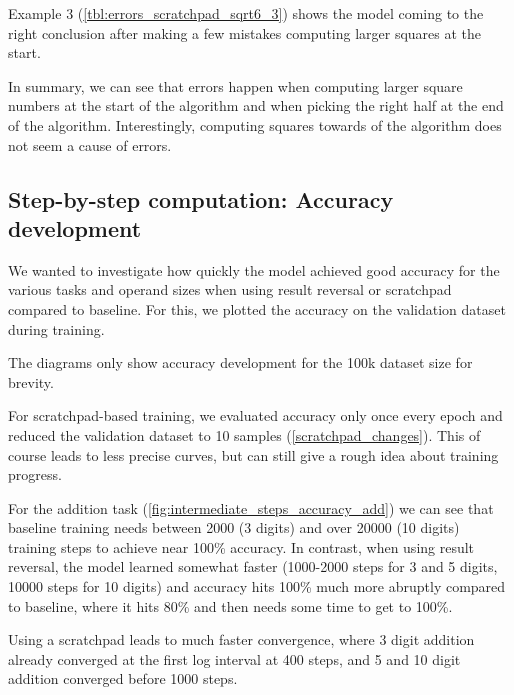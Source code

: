 Example 3 (\cref{tbl:errors_scratchpad_sqrt6_3}) shows the model coming to the right conclusion after making a few mistakes computing larger squares at the start.

In summary, we can see that errors happen when computing larger square numbers at the start of the algorithm and when picking the right half at the end of the algorithm. Interestingly, computing squares towards of the algorithm does not seem a cause of errors.


\subsection{Step-by-step computation: Accuracy development}

We wanted to investigate how quickly the model achieved good accuracy for the various tasks and operand sizes when using result reversal or scratchpad compared to baseline. For this, we plotted the accuracy on the validation dataset during training.

The diagrams only show accuracy development for the 100k dataset size for brevity.

For scratchpad-based training, we evaluated accuracy only once every epoch and reduced the validation dataset to 10 samples (\cref{scratchpad_changes}). This of course leads to less precise curves, but can still give a rough idea about training progress.


For the addition task (\cref{fig:intermediate_steps_accuracy_add}) we can see that baseline training needs between 2000 (3 digits) and over 20000 (10 digits) training steps to achieve near 100\% accuracy. In contrast, when using result reversal, the model learned somewhat faster (1000-2000 steps for 3 and 5 digits, 10000 steps for 10 digits) and accuracy hits 100\% much more abruptly compared to baseline, where it hits 80\% and then needs some time to get to 100\%.

Using a scratchpad leads to much faster convergence, where 3 digit addition already converged at the first log interval at 400 steps, and 5 and 10 digit addition converged before 1000 steps.





